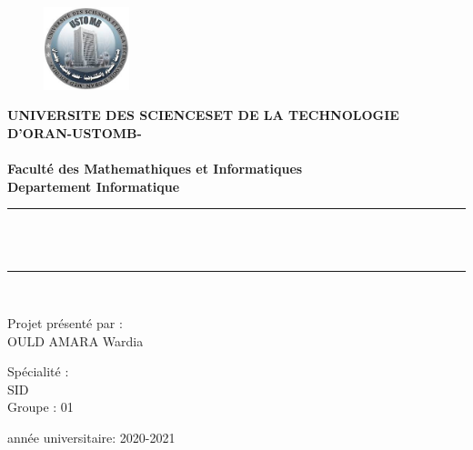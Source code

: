 
\begin{figure}
\vspace{-5 pt}
\includegraphics[width=2.5cm]{img/logo.jpg}
\centering
\end{figure}
 \textbf{\scriptsize UNIVERSITE DES SCIENCESET DE LA TECHNOLOGIE D’ORAN-USTOMB-  }\\ \\
 \textbf{\footnotesize
 Faculté des Mathemathiques et Informatiques \\
 Departement Informatique 
}
  \\[1.5cm]
\newcommand{\HRule}{\rule{\linewidth}{0.5mm}}

\begin{center}
\vfill

\HRule \\[0.6cm]

{\huge\bfseries{\color{red}{L'éthique et Data Scientist}} \\[0.25cm]}
\HRule \\[1.5cm]
\vfill

\vfill
\vfill


\vfill
\large{  Projet  présenté par : } \\
OULD AMARA Wardia

\vfill

\large{Spécialité :} \\
SID\\
Groupe : 01
\vfill
\bigskip


\vfill

 \vfill
       
     \vfill

année universitaire: 2020-2021
 \end{center}

 
